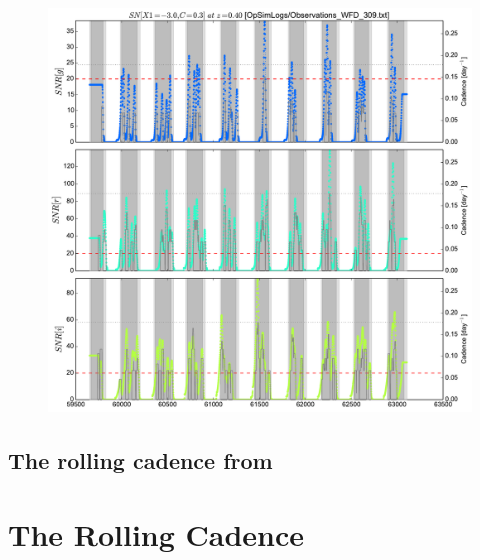 \documentclass[\docopts]{\docclass}
\begin{document}
\begin{figure}[t]
  \begin{center}
    \includegraphics[width=\linewidth]{metric_WFD_309.pdf}
    \caption{}
  \end{center}
\end{figure}




\subsection{The rolling cadence from }
\label{sec:results}


\section{The Rolling Cadence }
\label{sec:results}
\end{document}
